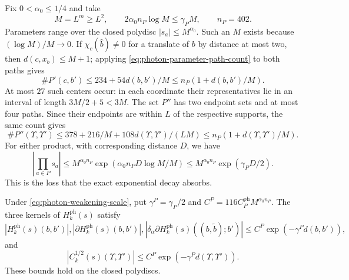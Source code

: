 Fix $0<\alpha_0\le1/4$ and take
\begin{equation}\label{eq:photon-weakening-scale}
 M=L^m\ge L^2,\qquad
 2\alpha_0n_P\log M\le\gamma_PM,\qquad n_P=402.
\end{equation}
Parameters range over the closed polydisc $|s_a|\le M^{\alpha_0}$.
Such an $M$ exists because $(\log M)/M\to0$.
If $\chi_c(\hat b)\ne0$ for a translate of $b$ by distance at
most two, then $d(c,x_b)\le M+1$; applying
\eqref{eq:photon-parameter-path-count} to both paths gives
\[
 \#P'(c,b')\le234+54d(b,b')/M
                              \le n_P(1+d(b,b')/M).
\]
At most $27$ such centers occur: in each coordinate their
representatives lie in an interval of length $3M/2+5<3M$.
The set $P''$ has two endpoint sets and at most four paths.
Since their endpoints are within $L$ of the respective supports,
the same count gives
\[
 \#P''(\Upsilon,\Upsilon')
 \le378+216/M+108d(\Upsilon,\Upsilon')/(LM)
 \le n_P(1+d(\Upsilon,\Upsilon')/M).
\]
For either product, with corresponding distance $D$, we have
\begin{equation}\label{eq:photon-weakening-product-bound}
 \left|\prod_{a\in P}s_a\right|
 \le M^{\alpha_0n_P}\exp(\alpha_0n_P D\log M/M)
 \le M^{\alpha_0n_P}\exp(\gamma_PD/2).
\end{equation}
This is the loss that the exact exponential decay absorbs.

\begin{proposition}\label{prop:photon-weakened-bounds}
Under \eqref{eq:photon-weakening-scale}, put
$\gamma^P=\gamma_P/2$ and $C^P=116C_P^{\mathrm{ph}}M^{\alpha_0n_P}$.
The three kernels of $H_k^{\mathrm{ph}}(s)$ satisfy
\begin{equation}\label{eq:photon-weakened-regularity}
 |H_k^{\mathrm{ph}}(s)(b,b')|,
 |\partial H_k^{\mathrm{ph}}(s)(b,b')|,
 |\delta_\alpha\partial H_k^{\mathrm{ph}}(s)((b,\tilde b);b')|
                                  \le C^P\exp(-\gamma^Pd(b,b')),
\end{equation}
and
\begin{equation}\label{eq:photon-weakened-root-decay}
 |C_k^{1/2}(s)(\Upsilon,\Upsilon')|
                  \le C^P\exp(-\gamma^Pd(\Upsilon,\Upsilon')).
\end{equation}
These bounds hold on the closed polydiscs.
\end{proposition}

